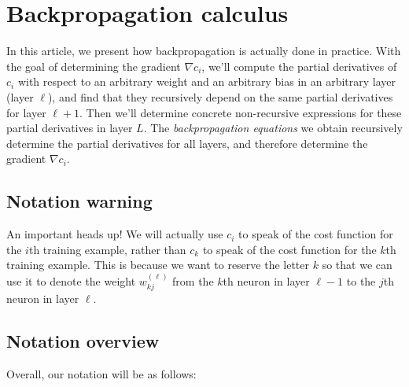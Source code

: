 \documentclass{article}
\begin{document}
	\section*{Backpropagation calculus}
	
	In this article, we present how backpropagation is actually done in practice. With the goal of determining the gradient $\nabla c_i$, we'll compute the partial derivatives of $c_i$ with respect to an arbitrary weight and an arbitrary bias in an arbitrary layer (layer $\ell$), and find that they recursively depend on the same partial derivatives for layer $\ell + 1$. Then we'll determine concrete non-recursive expressions for these partial derivatives in layer $L$. The \textit{backpropagation equations} we obtain recursively determine the partial derivatives for all layers, and therefore determine the gradient $\nabla c_i$.
	
	\subsection*{Notation warning}
	
	An important heads up! We will actually use $c_i$ to speak of the cost function for the $i$th training example, rather than $c_k$ to speak of the cost function for the $k$th training example. This is because we want to reserve the letter $k$ so that we can use it to denote the weight $w^{(\ell)}_{kj}$ from the $k$th neuron in layer $\ell - 1$ to the $j$th neuron in layer $\ell$.
	
	\subsection*{Notation overview}
	
	Overall, our notation will be as follows:
	
\end{document}
